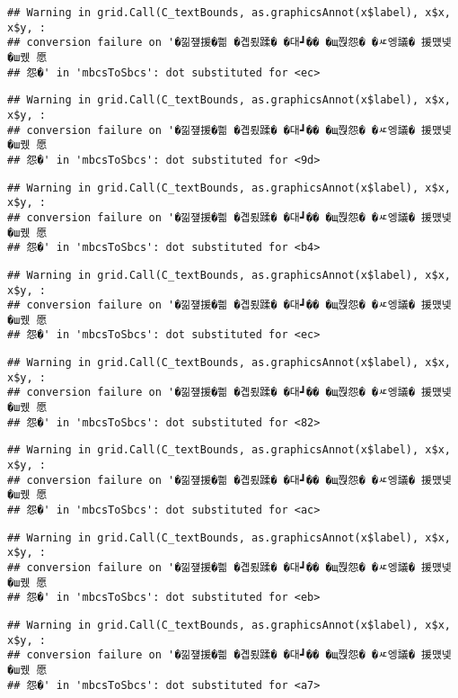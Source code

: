 \documentclass[
]{article}
\begin{document}
\begin{verbatim}
## Warning in grid.Call(C_textBounds, as.graphicsAnnot(x$label), x$x, x$y, :
## conversion failure on '�낆쟾援�쁾 �곕룄蹂� �대┛�� �щ쭩怨� �ㅼ엥議� 援먰넻�ш퀬 愿
## 怨�' in 'mbcsToSbcs': dot substituted for <ec>
\end{verbatim}

\begin{verbatim}
## Warning in grid.Call(C_textBounds, as.graphicsAnnot(x$label), x$x, x$y, :
## conversion failure on '�낆쟾援�쁾 �곕룄蹂� �대┛�� �щ쭩怨� �ㅼ엥議� 援먰넻�ш퀬 愿
## 怨�' in 'mbcsToSbcs': dot substituted for <9d>
\end{verbatim}

\begin{verbatim}
## Warning in grid.Call(C_textBounds, as.graphicsAnnot(x$label), x$x, x$y, :
## conversion failure on '�낆쟾援�쁾 �곕룄蹂� �대┛�� �щ쭩怨� �ㅼ엥議� 援먰넻�ш퀬 愿
## 怨�' in 'mbcsToSbcs': dot substituted for <b4>
\end{verbatim}

\begin{verbatim}
## Warning in grid.Call(C_textBounds, as.graphicsAnnot(x$label), x$x, x$y, :
## conversion failure on '�낆쟾援�쁾 �곕룄蹂� �대┛�� �щ쭩怨� �ㅼ엥議� 援먰넻�ш퀬 愿
## 怨�' in 'mbcsToSbcs': dot substituted for <ec>
\end{verbatim}

\begin{verbatim}
## Warning in grid.Call(C_textBounds, as.graphicsAnnot(x$label), x$x, x$y, :
## conversion failure on '�낆쟾援�쁾 �곕룄蹂� �대┛�� �щ쭩怨� �ㅼ엥議� 援먰넻�ш퀬 愿
## 怨�' in 'mbcsToSbcs': dot substituted for <82>
\end{verbatim}

\begin{verbatim}
## Warning in grid.Call(C_textBounds, as.graphicsAnnot(x$label), x$x, x$y, :
## conversion failure on '�낆쟾援�쁾 �곕룄蹂� �대┛�� �щ쭩怨� �ㅼ엥議� 援먰넻�ш퀬 愿
## 怨�' in 'mbcsToSbcs': dot substituted for <ac>
\end{verbatim}

\begin{verbatim}
## Warning in grid.Call(C_textBounds, as.graphicsAnnot(x$label), x$x, x$y, :
## conversion failure on '�낆쟾援�쁾 �곕룄蹂� �대┛�� �щ쭩怨� �ㅼ엥議� 援먰넻�ш퀬 愿
## 怨�' in 'mbcsToSbcs': dot substituted for <eb>
\end{verbatim}

\begin{verbatim}
## Warning in grid.Call(C_textBounds, as.graphicsAnnot(x$label), x$x, x$y, :
## conversion failure on '�낆쟾援�쁾 �곕룄蹂� �대┛�� �щ쭩怨� �ㅼ엥議� 援먰넻�ш퀬 愿
## 怨�' in 'mbcsToSbcs': dot substituted for <a7>
\end{verbatim}
\end{document}
